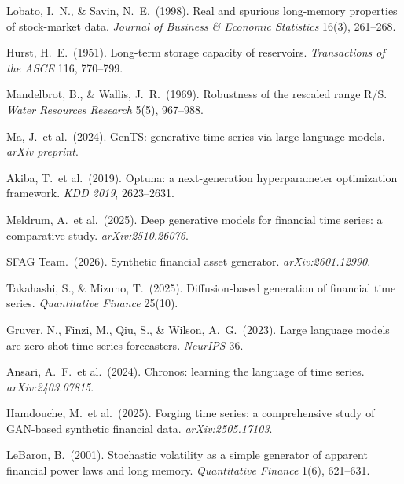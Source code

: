 \documentclass[10pt]{article}
\begin{document}
{\begin{enumerate}[label={\textbf{[\arabic*]}},leftmargin=2.8em,itemsep=4pt,parsep=0pt,topsep=2pt]
\item \hypertarget{R:22}{}%
  Lobato, I.\ N., \& Savin, N.\ E.\ (1998). Real and spurious long-memory properties of stock-market data. \textit{Journal of Business \& Economic Statistics} 16(3), 261--268.

\item \hypertarget{R:23}{}%
  Hurst, H.\ E.\ (1951). Long-term storage capacity of reservoirs. \textit{Transactions of the ASCE} 116, 770--799.

\item \hypertarget{R:24}{}%
  Mandelbrot, B., \& Wallis, J.\ R.\ (1969). Robustness of the rescaled range R/S. \textit{Water Resources Research} 5(5), 967--988.

\item \hypertarget{R:25}{}%
  Ma, J.\ et al.\ (2024). GenTS: generative time series via large language models. \textit{arXiv preprint}.

\item \hypertarget{R:26}{}%
  Akiba, T.\ et al.\ (2019). Optuna: a next-generation hyperparameter optimization framework. \textit{KDD 2019}, 2623--2631.

\item \hypertarget{R:27}{}%
  Meldrum, A.\ et al.\ (2025). Deep generative models for financial time series: a comparative study. \textit{arXiv:2510.26076}.

\item \hypertarget{R:28}{}%
  SFAG Team.\ (2026). Synthetic financial asset generator. \textit{arXiv:2601.12990}.

\item \hypertarget{R:29}{}%
  Takahashi, S., \& Mizuno, T.\ (2025). Diffusion-based generation of financial time series. \textit{Quantitative Finance} 25(10).

\item \hypertarget{R:30}{}%
  Gruver, N., Finzi, M., Qiu, S., \& Wilson, A.\ G.\ (2023). Large language models are zero-shot time series forecasters. \textit{NeurIPS} 36.

\item \hypertarget{R:31}{}%
  Ansari, A.\ F.\ et al.\ (2024). Chronos: learning the language of time series. \textit{arXiv:2403.07815}.

\item \hypertarget{R:32}{}%
  Hamdouche, M.\ et al.\ (2025). Forging time series: a comprehensive study of GAN-based synthetic financial data. \textit{arXiv:2505.17103}.

\item \hypertarget{R:33}{}%
  LeBaron, B.\ (2001). Stochastic volatility as a simple generator of apparent financial power laws and long memory. \textit{Quantitative Finance} 1(6), 621--631.


\end{enumerate}}
\end{document}
